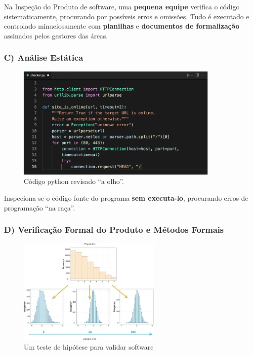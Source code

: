 \documentclass[
]{book}
\begin{document}
Na Inspeção do Produto de software, uma \textbf{pequena equipe} verifica o código sistematicamente, procurando por possíveis erros e omissões. Tudo é executado e controlado minuciosamente com \textbf{planilhas} e \textbf{documentos de formalização} assinados pelos gestores das áreas.

\subsubsection{C) Análise Estática}\label{c-anuxe1lise-estuxe1tica}

\begin{figure}
\centering
\includegraphics[width=3.875in,height=\textheight]{images/clipboard-2365986153.png}
\caption{Código python revisado ``a olho''.}
\end{figure}

Inspeciona-se o código fonte do programa \textbf{sem executa-lo}, procurando erros de programação ``na raça''.

\subsubsection{D) Verificação Formal do Produto e Métodos Formais}\label{d-verificauxe7uxe3o-formal-do-produto-e-muxe9todos-formais}

\begin{figure}
\centering
\includegraphics[width=2.73958in,height=\textheight]{images/clipboard-2859021921.png}
\caption{Um teste de hipótese para validar software}
\end{figure}
\end{document}
